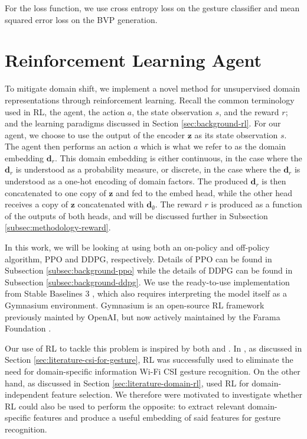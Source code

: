 For the loss function, we use cross entropy loss on the gesture classifier and mean squared error loss on the BVP generation.

\section{Reinforcement Learning Agent}\label{sec:methodology-rl}

To mitigate domain shift, we implement a novel method for unsupervised domain representations through reinforcement learning.
Recall the common terminology used in RL, the agent, the action $a$, the state observation $s$, and the reward $r$; and the learning paradigms discussed in Section \ref{sec:background-rl}.
For our agent, we choose to use the output of the encoder $\boldsymbol{z}$ as its state observation $s$.
The agent then performs an action $a$ which is what we refer to as the domain embedding $\boldsymbol{d}_r$.
This domain embedding is either continuous, in the case where the $\boldsymbol{d}_r$ is understood as a probability measure, or discrete, in the case where the $\boldsymbol{d}_r$ is understood as a one-hot encoding of domain factors.
The produced $\boldsymbol{d}_r$ is then concatenated to one copy of $\boldsymbol{z}$ and fed to the embed head, while the other head receives a copy of $\boldsymbol{z}$ concatenated with $\boldsymbol{d}_\emptyset$.
The reward $r$ is produced as a function of the outputs of both heads, and will be discussed further in Subsection \ref{subsec:methodology-reward}.

In this work, we will be looking at using both an on-policy and off-policy algorithm, PPO and DDPG, respectively.
Details of PPO can be found in Subsection \ref{subsec:background-ppo} while the details of DDPG can be found in Subsection \ref{subsec:background-ddpg}.
We use the ready-to-use implementation from Stable Baselines 3 \cite{raffin2021stable}, which also requires interpreting the model itself as a Gymnasium environment.
Gymnasium is an open-source RL framework previously mainted by OpenAI, but now actively maintained by the Farama Foundation \cite{towers2023gymnasium}.

Our use of RL to tackle this problem is inspired by both \cite{ma2021location} and \cite{zhang2021adversarial}.
In \cite{ma2021location}, as discussed in Section \ref{sec:literature-csi-for-gesture}, RL was successfully used to eliminate the need for domain-specific information Wi-Fi CSI gesture recognition.
On the other hand, as discussed in Section \ref{sec:literature-domain-rl}, \cite{zhang2021adversarial} used RL for domain-independent feature selection.
We therefore were motivated to investigate whether RL could also be used to perform the opposite: to extract relevant domain-specific features and produce a useful embedding of said features for gesture recognition.

